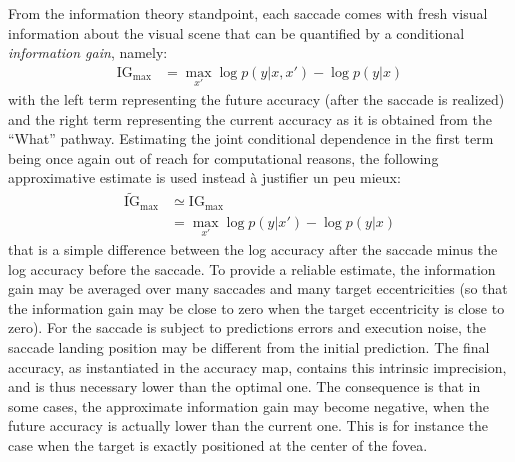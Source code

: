 From the information theory standpoint, each saccade comes with fresh visual information about the visual scene that can be quantified by a conditional \emph{information gain}, namely:
\begin{align}
\text{IG}_\text{max} &= \max_{x'} \log p(y|x,x') - \log p(y|x)\nonumber
\end{align}
with the left term representing the future accuracy (after the saccade is realized) and the right term representing the current accuracy as it is obtained from the ``What'' pathway.
Estimating the joint conditional dependence in the first term being once again out of reach for computational reasons, the following approximative estimate is used instead {\color{green} à justifier un peu mieux}:
\begin{align}
\tilde{\text{IG}}_\text{max}&\simeq \text{IG}_\text{max}\nonumber\\
&=\max_{x'} \log p(y|x') - \log p(y|x)\label{eq:IG}
\end{align}
that is a simple difference between the log accuracy after the saccade minus the log accuracy before the saccade.
To provide a reliable estimate, the information gain may be averaged over many saccades and many target eccentricities (so that the information gain may be close to zero when the target eccentricity is close to zero).
For the saccade is subject to predictions errors and execution noise, the saccade landing position may be different from the initial prediction. The final accuracy, as instantiated in the accuracy map, contains this intrinsic imprecision, and is thus necessary lower than the optimal one. The consequence is that in some cases, the approximate information gain may become negative, when the future accuracy is actually lower than the current one. This is for instance the case when the target is exactly positioned at the center of the fovea.

